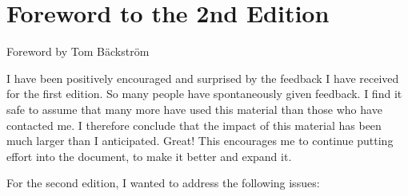 \documentclass[letterpaper,10pt,english]{jupyterBook}
\begin{document}
\section{Foreword to the 2nd Edition}
\label{\detokenize{Preface:foreword-to-the-2nd-edition}}
\sphinxAtStartPar
Foreword by Tom Bäckström

\sphinxAtStartPar
I have been positively encouraged and surprised by the feedback I have received for the first edition. So many people have spontaneously given feedback. I find it safe to assume that many more have used this material than those who have contacted me. I therefore conclude that the impact of this material has been much larger than I anticipated. Great! This encourages me to continue putting effort into the document, to make it better and expand it.

\sphinxAtStartPar
For the second edition, I wanted to address the following issues:
\end{document}
